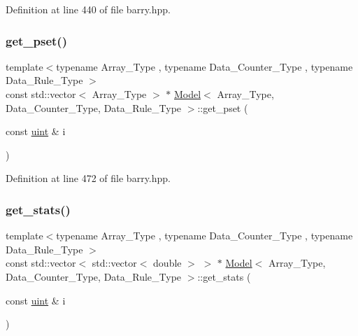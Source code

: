 Definition at line 440 of file barry.\+hpp.

\mbox{\label{classbarry_1_1_model_ad09221a8938765deec2c9d4d0fa8dec5}} 
\subsubsection{\texorpdfstring{get\+\_\+pset()}{get\_pset()}}
{\footnotesize\ttfamily template$<$typename Array\+\_\+\+Type , typename Data\+\_\+\+Counter\+\_\+\+Type , typename Data\+\_\+\+Rule\+\_\+\+Type $>$ \\
const std\+::vector$<$ Array\+\_\+\+Type $>$ $\ast$ \hyperlink{classbarry_1_1_model}{Model}$<$ Array\+\_\+\+Type, Data\+\_\+\+Counter\+\_\+\+Type, Data\+\_\+\+Rule\+\_\+\+Type $>$\+::get\+\_\+pset (\begin{DoxyParamCaption}\item[{const \hyperlink{namespacebarry_a11dfc53ddb4672278319aa04f1e09a6c}{uint} \&}]{i }\end{DoxyParamCaption})\hspace{0.3cm}{\ttfamily [inline]}}



Definition at line 472 of file barry.\+hpp.

\mbox{\label{classbarry_1_1_model_adde1cf74eb0ca7f771b7878af9766cdf}} 
\subsubsection{\texorpdfstring{get\+\_\+stats()}{get\_stats()}}
{\footnotesize\ttfamily template$<$typename Array\+\_\+\+Type , typename Data\+\_\+\+Counter\+\_\+\+Type , typename Data\+\_\+\+Rule\+\_\+\+Type $>$ \\
const std\+::vector$<$ std\+::vector$<$ double $>$ $>$ $\ast$ \hyperlink{classbarry_1_1_model}{Model}$<$ Array\+\_\+\+Type, Data\+\_\+\+Counter\+\_\+\+Type, Data\+\_\+\+Rule\+\_\+\+Type $>$\+::get\+\_\+stats (\begin{DoxyParamCaption}\item[{const \hyperlink{namespacebarry_a11dfc53ddb4672278319aa04f1e09a6c}{uint} \&}]{i }\end{DoxyParamCaption})\hspace{0.3cm}{\ttfamily [inline]}}



